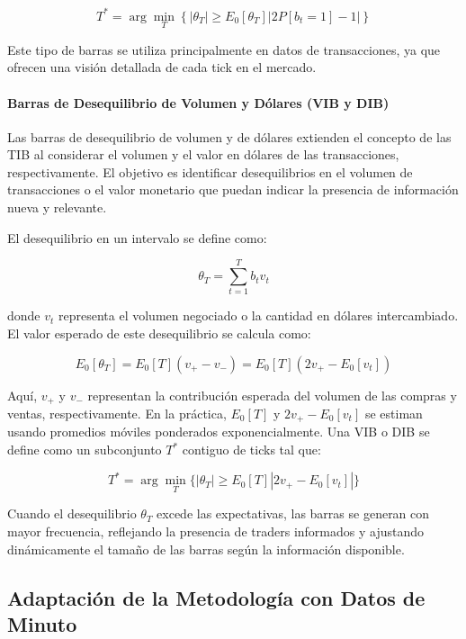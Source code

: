 \documentclass[a4paper,12pt, twoside]{report}
\begin{document}
\begin{equation}
T^* = \arg \min_T \left\{  | \theta_T | \geq E_0[\theta_T] |2P[b_t = 1] - 1 | \right\}
\end{equation}

Este tipo de barras se utiliza principalmente en datos de transacciones, ya que ofrecen una visión detallada de cada tick 
en el mercado.

\paragraph{Barras de Desequilibrio de Volumen y Dólares (VIB y DIB)}

Las barras de desequilibrio de volumen y de dólares extienden el concepto de las TIB al considerar el volumen 
y el valor en dólares de las transacciones, respectivamente. El objetivo es identificar desequilibrios en el volumen de 
transacciones o el valor monetario que puedan indicar la presencia de información nueva y relevante.

El desequilibrio en un intervalo se define como:

\begin{equation}
\theta_T = \sum_{t=1}^{T} b_t v_t
\end{equation}

donde \(v_t\) representa el volumen negociado o la cantidad en dólares intercambiado. El valor esperado de este desequilibrio 
se calcula como:

\begin{equation}
E_0[\theta_T] = E_0[T](v_+ - v_-) = E_0[T](2v_+ - E_0[v_t])
\end{equation}

Aquí, \(v_+\) y \(v_-\) representan la contribución esperada del volumen de las compras y ventas, respectivamente. En la 
práctica, \(E_0[T]\) y \(2v_+ - E_0[v_t]\) se estiman usando promedios móviles ponderados exponencialmente. Una VIB o DIB 
se define como un subconjunto \(T^*\) contiguo de ticks tal que:

\begin{equation}
T^* = \arg \min_{T} \{|\theta_T| \geq E_0[T]|2v_+ - E_0[v_t]| \}
\end{equation}

Cuando el desequilibrio \(\theta_T\) excede las expectativas, las barras se generan con mayor frecuencia, reflejando la 
presencia de traders informados y ajustando dinámicamente el tamaño de las barras según la información disponible.

\subsection{Adaptación de la Metodología con Datos de Minuto}
\end{document}
